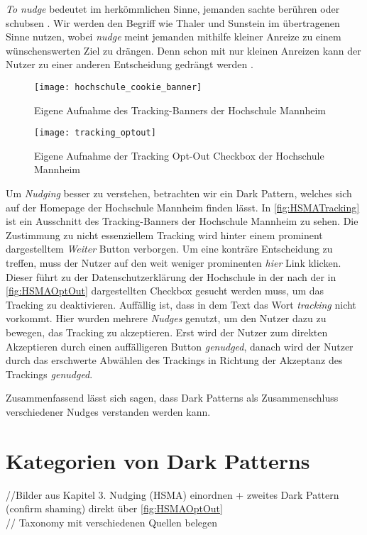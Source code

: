 \documentclass[conference,compsoc,final,a4paper]{IEEEtran}
\begin{document}
\textit{To nudge} bedeutet im herkömmlichen Sinne, jemanden sachte berühren oder schubsen \autocite{MerriamWebsterNudge}. Wir werden den Begriff wie Thaler und Sunstein im übertragenen Sinne nutzen, wobei \textit{nudge} meint jemanden mithilfe kleiner Anreize zu einem wünschenswerten Ziel zu drängen. Denn schon mit nur kleinen Anreizen kann der Nutzer zu einer anderen Entscheidung gedrängt werden \autocite{Narayanan2020}.

\begin{figure}[!ht]
\centering
\texttt{[image: hochschule\_cookie\_banner]}
\caption{Eigene Aufnahme des Tracking-Banners der Hochschule Mannheim~\autocite{HSMAWebsite2021}}
\label{fig:HSMATracking}
\end{figure}

\begin{figure}[!ht]
\centering
\texttt{[image: tracking\_optout]}
\caption{Eigene Aufnahme der Tracking Opt-Out Checkbox der Hochschule Mannheim~\autocite{HSMAWebsite2021}}
\label{fig:HSMAOptOut}
\end{figure}

Um \textit{Nudging} besser zu verstehen, betrachten wir ein Dark Pattern, welches sich auf der Homepage der Hochschule Mannheim finden lässt. In \autoref{fig:HSMATracking} ist ein Ausschnitt des Tracking-Banners der Hochschule Mannheim zu sehen. Die Zustimmung zu nicht essenziellem Tracking wird hinter einem prominent dargestelltem \textit{Weiter} Button verborgen. Um eine konträre Entscheidung zu treffen, muss der Nutzer auf den weit weniger prominenten \textit{hier} Link klicken. Dieser führt zu der Datenschutzerklärung der Hochschule in der nach der in \autoref{fig:HSMAOptOut} dargestellten Checkbox gesucht werden muss, um das Tracking zu deaktivieren. Auffällig ist, dass in dem Text das Wort \textit{tracking} nicht vorkommt. Hier wurden mehrere \textit{Nudges} genutzt, um den Nutzer dazu zu bewegen, das Tracking zu akzeptieren. Erst wird der Nutzer zum direkten Akzeptieren durch einen auffälligeren Button \textit{genudged}, danach wird der Nutzer durch das erschwerte Abwählen des Trackings in Richtung der Akzeptanz des Trackings \textit{genudged}.

Zusammenfassend lässt sich sagen, dass Dark Patterns als Zusammenschluss verschiedener Nudges verstanden werden kann.

\section{Kategorien von Dark Patterns}
//Bilder aus Kapitel 3. Nudging (HSMA) einordnen + zweites Dark Pattern (confirm shaming) direkt über \autoref{fig:HSMAOptOut}\\
// Taxonomy mit verschiedenen Quellen belegen \autocite*{Gray_2018,M.Bhoot2020,Brignull}
\end{document}
